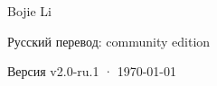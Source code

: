 \begin{titlepage}
\vfill
{\LARGE\sffamily Bojie Li\par}
\vspace{0.45cm}
{\small\sffamily\color{structurecolor!80} Русский перевод: community edition\par}
\vspace{0.3cm}
{\small\sffamily\color{structurecolor!80} Версия v2.0-ru.1 · \today\par}
\vspace{1.2cm}
\end{titlepage}
